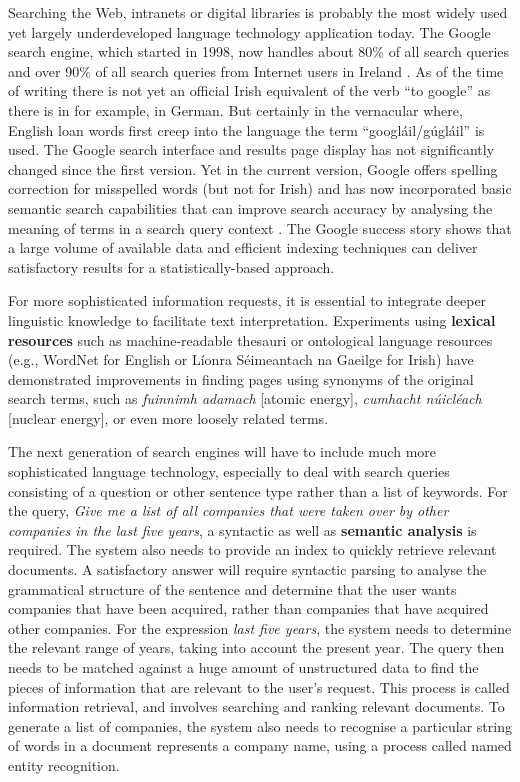 \begin{multicols}{2}
Searching the Web, intranets or digital libraries is probably the most widely used yet largely underdeveloped language technology application today. The Google search engine, which started in 1998, now handles about 80\% of all search queries and over 90\% of all search queries from Internet users in Ireland \cite{googlemarketshare}. As of the time of writing there is not yet an official Irish equivalent of the verb ``to google'' as there is in for example, in German. But certainly in the vernacular where, English loan words first creep into the language the term ``googláil/gúgláil'' \cite{kilgarriff2010} is used. The Google search interface and results page display has not significantly changed since the first version. Yet in the current version, Google offers spelling correction for misspelled words (but not for Irish) and has now incorporated basic semantic search capabilities that can improve search accuracy by analysing the meaning of terms in a search query context \cite{googlesemsearch}.  The Google success story shows that a large volume of available data and efficient indexing techniques can deliver satisfactory results for a statistically-based approach. 

For more sophisticated information requests, it is essential to integrate deeper linguistic knowledge to facilitate text interpretation. Experiments using \textbf{lexical resources} such as machine-readable thesauri or ontological language resources (e.g., WordNet for English or Líonra Séimeantach na Gaeilge for Irish) have demonstrated improvements in finding pages using synonyms of the original search terms, such as \textit{fuinnimh adamach} [atomic energy], \textit{cumhacht núicléach} [nuclear energy], or even more loosely related terms. 

The next generation of search engines will have to include much more sophisticated language technology, especially to deal with search queries consisting of a question or other sentence type rather than a list of keywords. For the query, \textit{Give me a list of all companies that were taken over by other companies in the last five years}, a syntactic as well as \textbf{semantic analysis} is required. The system also needs to provide an index to quickly retrieve relevant documents. A satisfactory answer will require syntactic parsing to analyse the grammatical structure of the sentence and determine that the user wants companies that have been acquired, rather than companies that have acquired other companies. For the expression \textit{last five years}, the system needs to determine the relevant range of years, taking into account the present year. The query then needs to be matched against a huge amount of unstructured data to find the pieces of information that are relevant to the user's request. This process is called information retrieval, and involves searching and ranking relevant documents. To generate a list of companies, the system also needs to recognise a particular string of words in a document represents a company name, using a process called named entity recognition.


\end{multicols}
